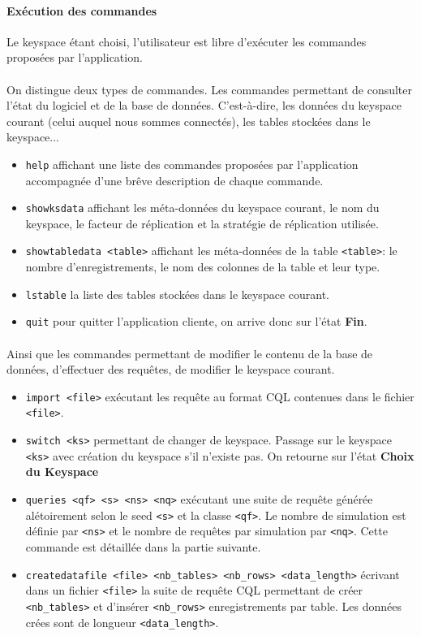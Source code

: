 \documentclass[12pt]{article}
\begin{document}
\paragraph{Exécution des commandes} Le keyspace étant choisi, l'utilisateur est libre d'exécuter les commandes proposées par l'application.
\paragraph{} On distingue deux types de commandes. Les commandes permettant de consulter l'état du logiciel et de la base de données. 
C'est-à-dire, les données du keyspace courant (celui auquel nous sommes connectés), les tables stockées dans le keyspace...
\begin{itemize}
 \item \texttt{help} affichant une liste des commandes proposées par l'application accompagnée d'une brêve description de chaque commande.
 \item \texttt{showksdata} affichant les méta-données du keyspace courant, le nom du keyspace, le facteur de réplication et la stratégie de réplication utilisée.
 \item \texttt{showtabledata <table>} affichant les méta-données de la table \texttt{<table>}: le nombre d'enregistrements, le nom des colonnes de la table et leur type.
 \item \texttt{lstable} la liste des tables stockées dans le keyspace courant.
 \item \texttt{quit} pour quitter l'application cliente, on arrive donc sur l'état \textbf{Fin}.
\end{itemize} 

\paragraph{} Ainsi que les commandes permettant de modifier le contenu de la base de données, d'effectuer des requêtes, de modifier le keyspace courant.
\begin{itemize}
 \item \texttt{import <file>} exécutant les requête au format CQL contenues dans le fichier \texttt{<file>}.
 \item \texttt{switch <ks>} permettant de changer de keyspace. Passage sur le keyspace \texttt{<ks>} avec création du keyspace s'il n'existe pas.
 On retourne sur l'état \textbf{Choix du Keyspace}
 \item \texttt{queries <qf> <s> <ns> <nq>} exécutant une suite de requête générée alétoirement selon le seed \texttt{<s>} et la classe \texttt{<qf>}.
 Le nombre de simulation est définie par \texttt{<ns>} et le nombre de requêtes par simulation par \texttt{<nq>}. Cette commande est détaillée dans la partie suivante.
 \item \texttt{createdatafile  <file> <nb\_tables> <nb\_rows> <data\_length>} écrivant dans un fichier \texttt{<file>} la suite de requête CQL permettant de créer \texttt{<nb\_tables>} 
 et d'insérer \texttt{<nb\_rows>} enregistrements par table. Les données crées sont de longueur \texttt{<data\_length>}.
\end{itemize}
 
\end{document}
